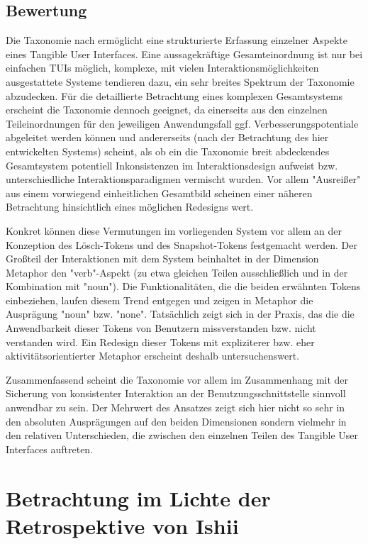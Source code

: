 \subsection{Bewertung}

Die Taxonomie nach \citeauthor{Fishkin04} ermöglicht eine strukturierte Erfassung einzelner Aspekte eines Tangible User Interfaces. Eine aussagekräftige Gesamteinordnung ist nur bei einfachen \glspl{TUI} möglich, komplexe, mit vielen Interaktionsmöglichkeiten ausgestattete Systeme tendieren dazu, ein sehr breites Spektrum der Taxonomie abzudecken. Für die detaillierte Betrachtung eines komplexen Gesamtsystems erscheint die Taxonomie dennoch geeignet, da einerseits aus den einzelnen Teileinordnungen für den jeweiligen Anwendungsfall ggf. Verbesserungspotentiale abgeleitet werden können und andererseits (nach der Betrachtung des hier entwickelten Systems) scheint, als ob ein die Taxonomie breit abdeckendes Gesamtsystem potentiell Inkonsistenzen im Interaktionsdesign aufweist bzw. unterschiedliche Interaktionsparadigmen vermischt wurden. Vor allem "Ausreißer" aus einem vorwiegend einheitlichen Gesamtbild scheinen einer näheren Betrachtung hinsichtlich eines möglichen Redesigns wert.

Konkret können diese Vermutungen im vorliegenden System vor allem an der Konzeption des Lösch-Tokens und des Snapshot-Tokens festgemacht werden. Der Großteil der Interaktionen mit dem System beinhaltet in der Dimension Metaphor den "verb"-Aspekt (zu etwa gleichen Teilen ausschließlich und in der Kombination mit "noun"). Die Funktionalitäten, die die beiden erwähnten Tokens einbeziehen, laufen diesem Trend entgegen und zeigen in Metaphor die Ausprägung "noun" bzw. "none". Tatsächlich zeigt sich in der Praxis, das die die Anwendbarkeit dieser Tokens von Benutzern missverstanden bzw. nicht verstanden wird. Ein Redesign dieser Tokens mit expliziterer bzw. eher aktivitätsorientierter Metaphor erscheint deshalb untersuchenswert.

Zusammenfassend scheint die Taxonomie vor allem im Zusammenhang mit der Sicherung von konsistenter Interaktion an der Benutzungsschnittstelle sinnvoll anwendbar zu sein. Der Mehrwert des Ansatzes zeigt sich hier nicht so sehr in den absoluten Ausprägungen auf den beiden Dimensionen sondern vielmehr in den relativen Unterschieden, die zwischen den einzelnen Teilen des Tangible User Interfaces auftreten.


\section{Betrachtung im Lichte der Retrospektive von Ishii} %
\label{sec:betrachtung_im_lichte_der_retrospektive_von_ishii}

